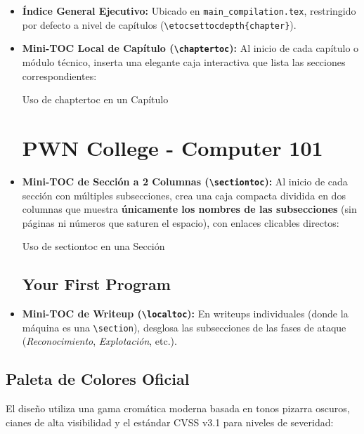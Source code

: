 \documentclass[../../main_compilation.tex]{subfiles}
\begin{document}
\begin{itemize}
	\item \textbf{Índice General Ejecutivo:} Ubicado en \texttt{main\_compilation.tex}, restringido por defecto a nivel de capítulos (\texttt{\textbackslash etocsettocdepth\{chapter\}}).
	\item \textbf{Mini-TOC Local de Capítulo (\texttt{\textbackslash chaptertoc}):} Al inicio de cada capítulo o módulo técnico, inserta una elegante caja interactiva que lista las secciones correspondientes:
\begin{codebox}[latex]{Uso de chaptertoc en un Capítulo}
\chapter{PWN College - Computer 101}
\chaptertoc %
\end{codebox}
	\item \textbf{Mini-TOC de Sección a 2 Columnas (\texttt{\textbackslash sectiontoc}):} Al inicio de cada sección con múltiples subsecciones, crea una caja compacta dividida en dos columnas que muestra \textbf{únicamente los nombres de las subsecciones} (sin páginas ni números que saturen el espacio), con enlaces clicables directos:
\begin{codebox}[latex]{Uso de sectiontoc en una Sección}
\section{Your First Program}
\sectiontoc %
\end{codebox}
	\item \textbf{Mini-TOC de Writeup (\texttt{\textbackslash localtoc}):} En writeups individuales (donde la máquina es una \texttt{\textbackslash section}), desglosa las subsecciones de las fases de ataque (\textit{Reconocimiento}, \textit{Explotación}, etc.).
\end{itemize}


\section{Paleta de Colores Oficial}
El diseño utiliza una gama cromática moderna basada en tonos pizarra oscuros, cianes de alta visibilidad y el estándar CVSS v3.1 para niveles de severidad:
\end{document}

